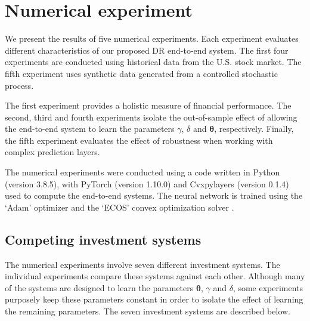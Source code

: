 \documentclass[10pt, twocolumn]{article}
\theoremstyle{plain}
\theoremstyle{definition}
\begin{document}
\section{Numerical experiment}\label{sec:num_ex}
We present the results of five numerical experiments. Each experiment 
evaluates different characteristics of our proposed DR end-to-end system. 
The first four experiments are conducted using historical data from
the U.S. stock market. The fifth experiment uses synthetic data generated
from a controlled stochastic process.  

The first experiment provides a holistic measure of financial performance. 
The second, third and fourth experiments isolate the out-of-sample effect 
of allowing the end-to-end system to learn the parameters \(\gamma\), 
\(\delta\) and \(\bm{\theta}\), respectively. Finally, the fifth experiment 
evaluates the effect of robustness when working with complex prediction 
layers.

The numerical experiments were conducted using a code written in
Python (version 3.8.5), with PyTorch (version 1.10.0) 
\citep{paszke2019pytorch} and Cvxpylayers (version 0.1.4) 
\citep{agrawal2019differentiable} used to compute the
end-to-end systems. The neural network is trained using the `Adam'
optimizer \citep{kingma2014adam} and the `ECOS' convex optimization 
solver \citep{domahidi2013ecos}.

\subsection{Competing investment systems}\label{sec:ex_models}

The numerical experiments involve seven different investment systems. 
The individual experiments compare these systems against each other. 
Although many of the systems are designed to learn the parameters \(\bm{\theta}\), 
\(\gamma\) and \(\delta\), some experiments purposely keep these parameters 
constant in order to isolate the effect of learning the remaining parameters. 
The seven investment systems are described below.
\end{document}
